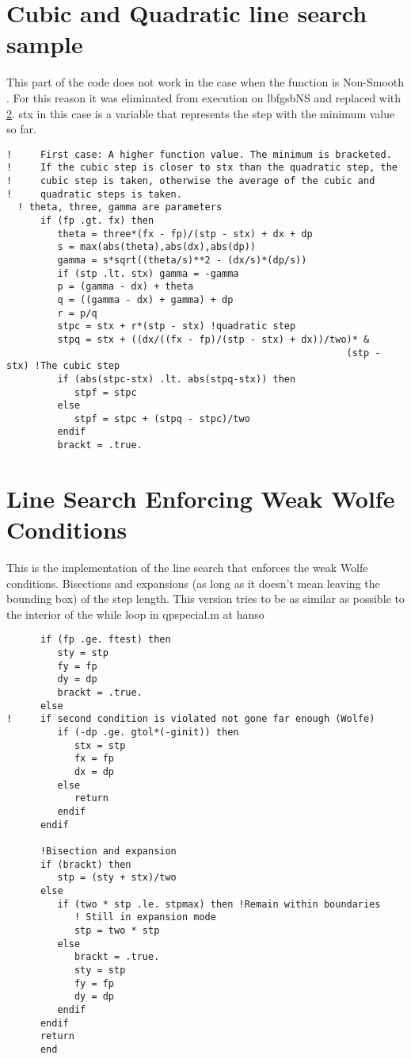 \section{Cubic and Quadratic line search sample}
This part of the code does not work in the case when the function is Non-Smooth \label{nsnowork}. For this reason it was eliminated from execution on lbfgsbNS and replaced with \ref{linesearchww}. stx in this case is a variable that represents the step with the minimum value so far.
\lstset{
  firstnumber = 3881
}

\begin{lstlisting}
!     First case: A higher function value. The minimum is bracketed. 
!     If the cubic step is closer to stx than the quadratic step, the 
!     cubic step is taken, otherwise the average of the cubic and 
!     quadratic steps is taken.
  ! theta, three, gamma are parameters
      if (fp .gt. fx) then
         theta = three*(fx - fp)/(stp - stx) + dx + dp
         s = max(abs(theta),abs(dx),abs(dp))
         gamma = s*sqrt((theta/s)**2 - (dx/s)*(dp/s))
         if (stp .lt. stx) gamma = -gamma
         p = (gamma - dx) + theta
         q = ((gamma - dx) + gamma) + dp
         r = p/q
         stpc = stx + r*(stp - stx) !quadratic step
         stpq = stx + ((dx/((fx - fp)/(stp - stx) + dx))/two)* &
                                                            (stp - stx) !The cubic step
         if (abs(stpc-stx) .lt. abs(stpq-stx)) then
            stpf = stpc
         else
            stpf = stpc + (stpq - stpc)/two
         endif
         brackt = .true.
\end{lstlisting}

\section{Line Search Enforcing Weak Wolfe Conditions}\label{linesearchww}
This is the implementation of the line search that enforces the weak Wolfe conditions. Bisections and expansions (as long as it doesn't mean leaving the bounding box) of the step length. This version tries to be as similar as possible to the interior of the while loop in qpspecial.m at hanso \citep{hanso}
\lstset{
  firstnumber = 4425
}

\begin{lstlisting}
      if (fp .ge. ftest) then 
         sty = stp
         fy = fp
         dy = dp
         brackt = .true.
      else
!     if second condition is violated not gone far enough (Wolfe)
         if (-dp .ge. gtol*(-ginit)) then
            stx = stp
            fx = fp
            dx = dp
         else
            return
         endif
      endif   
      
      !Bisection and expansion
      if (brackt) then
         stp = (sty + stx)/two
      else
         if (two * stp .le. stpmax) then !Remain within boundaries
            ! Still in expansion mode
            stp = two * stp
         else
            brackt = .true.
            sty = stp
            fy = fp
            dy = dp
         endif
      endif
      return
      end
\end{lstlisting}

